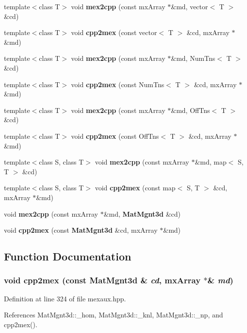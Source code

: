 \begin{CompactItemize}
\item 
template$<$class T$>$ void {\bf mex2cpp} (const mx\-Array $\ast$\&md, vector$<$ T $>$ \&cd)
\item 
template$<$class T$>$ void {\bf cpp2mex} (const vector$<$ T $>$ \&cd, mx\-Array $\ast$\&md)
\item 
template$<$class T$>$ void {\bf mex2cpp} (const mx\-Array $\ast$\&md, Num\-Tns$<$ T $>$ \&cd)
\item 
template$<$class T$>$ void {\bf cpp2mex} (const Num\-Tns$<$ T $>$ \&cd, mx\-Array $\ast$\&md)
\item 
template$<$class T$>$ void {\bf mex2cpp} (const mx\-Array $\ast$\&md, Off\-Tns$<$ T $>$ \&cd)
\item 
template$<$class T$>$ void {\bf cpp2mex} (const Off\-Tns$<$ T $>$ \&cd, mx\-Array $\ast$\&md)
\item 
template$<$class S, class T$>$ void {\bf mex2cpp} (const mx\-Array $\ast$\&md, map$<$ S, T $>$ \&cd)
\item 
template$<$class S, class T$>$ void {\bf cpp2mex} (const map$<$ S, T $>$ \&cd, mx\-Array $\ast$\&md)
\item 
void {\bf mex2cpp} (const mx\-Array $\ast$\&md, {\bf Mat\-Mgnt3d} \&cd)
\item 
void {\bf cpp2mex} (const {\bf Mat\-Mgnt3d} \&cd, mx\-Array $\ast$\&md)
\end{CompactItemize}


\subsection{Function Documentation}
\subsubsection{\setlength{\rightskip}{0pt plus 5cm}void cpp2mex (const {\bf Mat\-Mgnt3d} \& {\em cd}, mx\-Array $\ast$\& {\em md})\hspace{0.3cm}{\tt  [inline]}}\label{mexaux_8hpp_dfdf350a250a91acafa535e3a35b3f0f_dfdf350a250a91acafa535e3a35b3f0f}




Definition at line 324 of file mexaux.hpp.

References Mat\-Mgnt3d::\_\-hom, Mat\-Mgnt3d::\_\-knl, Mat\-Mgnt3d::\_\-np, and cpp2mex().

